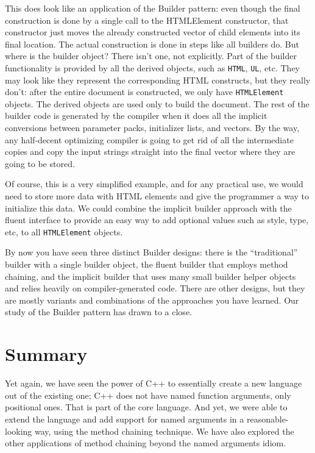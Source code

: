 This does look like an application of the Builder pattern: even though the final construction is done by a single call to the HTMLElement constructor, that constructor just moves the already constructed vector of child elements into its final location. The actual construction is done in steps like all builders do. But where is the builder object? There isn't one, not explicitly. Part of the builder functionality is provided by all the derived objects, such as \texttt{HTML}, \texttt{UL}, etc. They may look like they represent the corresponding HTML constructs, but they really don't: after the entire document is constructed, we only have \texttt{HTMLElement} objects. The derived objects are used only to build the document. The rest of the builder code is generated by the compiler when it does all the implicit conversions between parameter packs, initializer lists, and vectors. By the way, any half-decent optimizing compiler is going to get rid of all the intermediate copies and copy the input strings straight into the final vector where they are going to be stored.

Of course, this is a very simplified example, and for any practical use, we would need to store more data with HTML elements and give the programmer a way to initialize this data. We could combine the implicit builder approach with the fluent interface to provide an easy way to add optional values such as style, type, etc, to all \texttt{HTMLElement} objects.

By now you have seen three distinct Builder designs: there is the ``traditional'' builder with a single builder object, the fluent builder that employs method chaining, and the implicit builder that uses many small builder helper objects and relies heavily on compiler-generated code. There are other designs, but they are mostly variants and combinations of the approaches you have learned. Our study of the Builder pattern has drawn to a close.

\section{Summary}

Yet again, we have seen the power of C++ to essentially create a new language out of the existing one; C++ does not have named function arguments, only positional ones. That is part of the core language. And yet, we were able to extend the language and add support for named arguments in a reasonable-looking way, using the method chaining technique. We have also explored the other applications of method chaining beyond the named arguments idiom.


